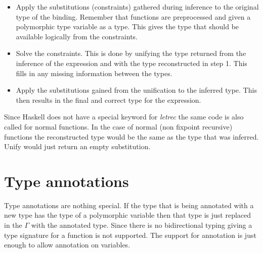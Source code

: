 \begin{itemize}
\item Apply the substitutions (constraints) gathered during inference to the original type of the binding. Remember that functions are preprocessed and given a polymorphic type variable as a type. This gives the type that should be available logically from the constraints.
\item Solve the constraints. This is done by unifying the type returned from the inference of the expression and with the type reconstructed in step 1. This fills in any missing information between the types.
\item Apply the substitutions gained from the unification to the inferred type. This then results in the final and correct type for the expression.
\end{itemize}

Since Haskell does not have a special keyword for \emph{letrec} the same code is also called for normal functions. In the case of normal (non fixpoint recursive) functions the reconstructed type would be the same as the type that was inferred. Unify would just return an empty substitution.

\section{Type annotations}
Type annotations are nothing special. If the type that is being annotated with a new type has the type of a polymorphic variable then that type is just replaced in the $\Gamma$ with the annotated type. Since there is no bidirectional typing giving a type signature for a function is not supported. The support for annotation is just enough to allow annotation on variables.
